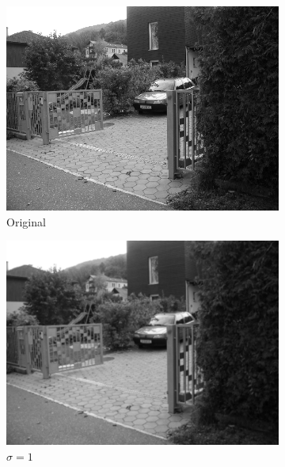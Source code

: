 \documentclass[thesis.tex]{subfiles}
\begin{document}
\begin{figure}[p]
	\centering
	\begin{subfigure}[t]{0.3\textwidth}
		\includegraphics[width=\textwidth]{img/scaleSpaceTheory_0.png}
		\caption{Original}
		\label{fig:scaleSpaceExample0}
	\end{subfigure}
	\begin{subfigure}[t]{0.3\textwidth}
		\includegraphics[width=\textwidth]{img/scaleSpaceTheory_1.png}
		\caption{$\sigma = 1$}
		\label{fig:scaleSpaceExample1}
	\end{subfigure}
	\begin{subfigure}[t]{0.3\textwidth}

\end{subfigure}
\end{figure}
\end{document}
